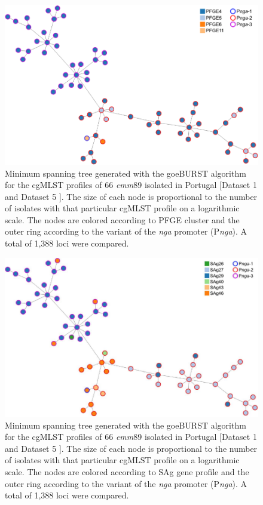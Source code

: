 \newpage
\begin{figure}[h!]
    \centering
    \includegraphics[angle=0,width=\textwidth]{figures/chapter 4/FigureS16.pdf}
    \caption{Minimum spanning tree generated with the goeBURST algorithm for the \ac{cgMLST} profiles of 66 \textit{emm}89 isolated in Portugal [Dataset 1 and Dataset 5 \cite{friaes_supplemental_2023}]. The size of each node is proportional to the number of isolates with that particular \ac{cgMLST} profile on a logarithmic scale. The nodes are colored according to \ac{PFGE} cluster and the outer ring according to the variant of the \textit{nga} promoter (P\textit{nga}). A total of 1,388 loci were compared.}
    \label{fig:chap4_figureS16}
\end{figure}

\newpage
\begin{figure}[h!]
    \centering
    \includegraphics[angle=0,width=\textwidth]{figures/chapter 4/FigureS17.pdf}
    \caption{Minimum spanning tree generated with the goeBURST algorithm for the \ac{cgMLST} profiles of 66 \textit{emm}89 isolated in Portugal [Dataset 1 and Dataset 5 \cite{friaes_supplemental_2023}]. The size of each node is proportional to the number of isolates with that particular \ac{cgMLST} profile on a logarithmic scale. The nodes are colored according to SAg gene profile and the outer ring according to the variant of the \textit{nga} promoter (P\textit{nga}). A total of 1,388 loci were compared.}
    \label{fig:chap4_figureS17}
\end{figure}

